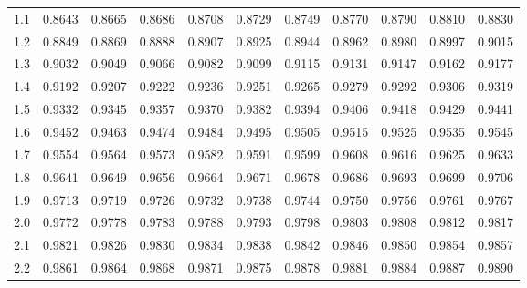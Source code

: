 \begin{tabular}{lllllllllll}
1.1 & 0.8643 & 0.8665 & 0.8686 & 0.8708 & 0.8729 & 0.8749 & 0.8770 & 0.8790 & 0.8810 & 0.8830 \\
1.2 & \cellcolor{gray!20}0.8849 & \cellcolor{gray!20}0.8869 & \cellcolor{gray!20}0.8888 & \cellcolor{gray!20}0.8907 & \cellcolor{gray!20}0.8925 & \cellcolor{gray!20}0.8944 & \cellcolor{gray!20}0.8962 & \cellcolor{gray!20}0.8980 & \cellcolor{gray!20}0.8997 & \cellcolor{gray!20}0.9015 \\
1.3 & 0.9032 & 0.9049 & 0.9066 & 0.9082 & 0.9099 & 0.9115 & 0.9131 & 0.9147 & 0.9162 & 0.9177 \\
1.4 & \cellcolor{gray!20}0.9192 & \cellcolor{gray!20}0.9207 & \cellcolor{gray!20}0.9222 & \cellcolor{gray!20}0.9236 & \cellcolor{gray!20}0.9251 & \cellcolor{gray!20}0.9265 & \cellcolor{gray!20}0.9279 & \cellcolor{gray!20}0.9292 & \cellcolor{gray!20}0.9306 & \cellcolor{gray!20}0.9319 \\
1.5 & 0.9332 & 0.9345 & 0.9357 & 0.9370 & 0.9382 & 0.9394 & 0.9406 & 0.9418 & 0.9429 & 0.9441 \\
1.6 & \cellcolor{gray!20}0.9452 & \cellcolor{gray!20}0.9463 & \cellcolor{gray!20}0.9474 & \cellcolor{gray!20}0.9484 & \cellcolor{gray!20}0.9495 & \cellcolor{gray!20}0.9505 & \cellcolor{gray!20}0.9515 & \cellcolor{gray!20}0.9525 & \cellcolor{gray!20}0.9535 & \cellcolor{gray!20}0.9545 \\
1.7 & 0.9554 & 0.9564 & 0.9573 & 0.9582 & 0.9591 & 0.9599 & 0.9608 & 0.9616 & 0.9625 & 0.9633 \\
1.8 & \cellcolor{gray!20}0.9641 & \cellcolor{gray!20}0.9649 & \cellcolor{gray!20}0.9656 & \cellcolor{gray!20}0.9664 & \cellcolor{gray!20}0.9671 & \cellcolor{gray!20}0.9678 & \cellcolor{gray!20}0.9686 & \cellcolor{gray!20}0.9693 & \cellcolor{gray!20}0.9699 & \cellcolor{gray!20}0.9706 \\
1.9 & 0.9713 & 0.9719 & 0.9726 & 0.9732 & 0.9738 & 0.9744 & 0.9750 & 0.9756 & 0.9761 & 0.9767 \\
2.0 & \cellcolor{gray!20}0.9772 & \cellcolor{gray!20}0.9778 & \cellcolor{gray!20}0.9783 & \cellcolor{gray!20}0.9788 & \cellcolor{gray!20}0.9793 & \cellcolor{gray!20}0.9798 & \cellcolor{gray!20}0.9803 & \cellcolor{gray!20}0.9808 & \cellcolor{gray!20}0.9812 & \cellcolor{gray!20}0.9817 \\
2.1 & 0.9821 & 0.9826 & 0.9830 & 0.9834 & 0.9838 & 0.9842 & 0.9846 & 0.9850 & 0.9854 & 0.9857 \\
2.2 & \cellcolor{gray!20}0.9861 & \cellcolor{gray!20}0.9864 & \cellcolor{gray!20}0.9868 & \cellcolor{gray!20}0.9871 & \cellcolor{gray!20}0.9875 & \cellcolor{gray!20}0.9878 & \cellcolor{gray!20}0.9881 & \cellcolor{gray!20}0.9884 & \cellcolor{gray!20}0.9887 & \cellcolor{gray!20}0.9890 \\

\end{tabular}
